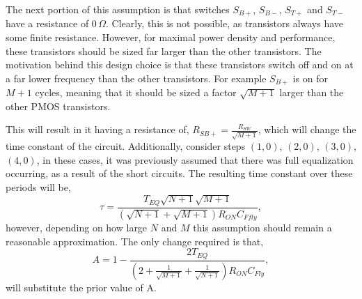 \documentclass[conference]{article}
\begin{document}
 	The next portion of this assumption is that switches $S_{B+}$, $S_{B-}$, $S_{T+}$ and $S_{T-}$ have a resistance of 0$\,\Omega$. Clearly, this is not possible, as transistors always have some finite resistance. However, for maximal power density and performance, these transistors should be sized far larger than the other transistors. The motivation behind this design choice is that these transistors switch off and on at a far lower frequency than the other transistors. For example $S_{B+}$ is on for $M+1$ cycles, meaning that it should be sized a factor $\sqrt{M+1}$ larger than the other PMOS transistors.
 	
 	This will result in it having a resistance of,
 	$R_{SB+} = \frac{R_{SW}}{\sqrt{M+1}}$, which will change the time constant of the circuit. Additionally, consider steps $(1,0)$, $(2,0)$, $(3,0)$, $(4,0)$, in these cases, it was previously assumed that there was full equalization occurring, as a result of the short circuits. The resulting time constant over these periods will be,
 	\begin{equation}
 	\tau = \frac{T_{EQ}\sqrt{N+1}\sqrt{M+1}}{(\sqrt{N+1}+\sqrt{M+1})R_{ON}C_{Ffly}},
 	\end{equation} 
 	however, depending on how large $N$ and $M$ this assumption should remain a reasonable approximation. The only change required is that,
 	\begin{equation}
 	A = 1 - \frac{2T_{EQ}}{\left(2+\frac{1}{\sqrt{M+1}}+\frac{1}{\sqrt{N+1}}\right)R_{ON}C_{Fly}},
 	\end{equation} 
 	will substitute the prior value of A.
 	
 	
 	
 	
\end{document}
